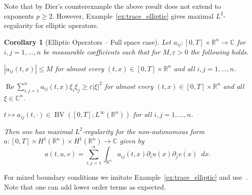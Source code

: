 \documentclass[reqno,a4paper,final]{amsart}
\numberwithin{equation}{section}
\newtheorem{corollary}[lemma]{Corollary}
\theoremstyle{definition}
\begin{document}
	Note that by Dier's counterexample the above result does not extend to exponents $p \ge 2$. However, Example~\ref{ex:trace_elliptic} gives maximal $L^2$-regularity for elliptic operators.
	
	\begin{corollary}[Elliptic Operators -- Full space case]
		Let $a_{ij}\colon [0,T] \times {\mathbb{R}}^n \to {\mathbb{C}}$ for $i, j = 1, \ldots, n$ be measurable coefficients such that for $M, {\varepsilon} > 0$ the following holds.
		\begin{thm_enum}
			\item ${\left\lvert{a_{ij}(t,x)}\right\rvert} \le M$ for almost every $(t,x) \in [0,T] \times {\mathbb{R}}^n$ and all $i,j = 1, \ldots, n$.
			\item ${\operatorname{Re}} \sum_{i,j=1}^n a_{ij}(t,x) \xi_i \xi_j \ge {\varepsilon} {\left\lvert{\xi}\right\rvert}^2$ for almost every $(t,x) \in [0,T] \times {\mathbb{R}}^n$ and all $\xi \in {\mathbb{C}}^n$.
			\item $t \mapsto a_{ij}(t,\cdot) \in \operatorname{BV}([0,T];L^{\infty}({\mathbb{R}}^n))$ for all $i,j = 1, \ldots, n$.
		\end{thm_enum}
		Then one has maximal $L^2$-regularity for the non-autonomous form $a\colon [0,T] \times H^1({\mathbb{R}}^n) \times H^1({\mathbb{R}}^n) \to {\mathbb{C}}$ given by
		\begin{equation*}
			a(t,u,v) = \sum_{i,j=1}^n \int_{{\mathbb{R}}^n} a_{ij}(t,x) \partial_i u(x) \overline{\partial_j v(x)} {\mathop{}\!d} x.
		\end{equation*} 
	\end{corollary}
	
	For mixed boundary conditions we imitate Example~\ref{ex:trace_elliptic} and use~\cite[Theorem~1]{AKM06}. Note that one can add lower order terms as expected.
	
\end{document}

